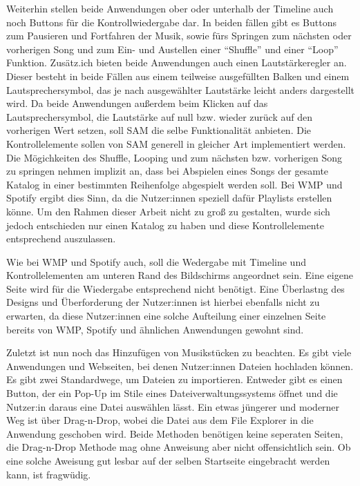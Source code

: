 Weiterhin stellen beide Anwendungen ober oder unterhalb der Timeline auch noch Buttons für die Kontrollwiedergabe dar.
In beiden fällen gibt es Buttons zum Pausieren und Fortfahren der Musik, sowie fürs Springen zum nächsten oder vorherigen Song und zum Ein- und Austellen einer \enquote{Shuffle} und einer \enquote{Loop} Funktion.
Zusätz.ich bieten beide Anwendungen auch einen Lautstärkeregler an.
Dieser besteht in beide Fällen aus einem teilweise ausgefüllten Balken und einem Lautsprechersymbol, das je nach ausgewählter Lautstärke leicht anders dargestellt wird.
Da beide Anwendungen außerdem beim Klicken auf das Lautsprechersymbol, die Lautstärke auf null bzw. wieder zurück auf den vorherigen Wert setzen, soll \ac{SAM} die selbe Funktionalität anbieten.
Die Kontrollelemente sollen von \ac{SAM} generell in gleicher Art implementiert werden.
Die Mögichkeiten des Shuffle, Looping und zum nächsten bzw. vorherigen Song zu springen nehmen implizit an, dass bei Abspielen eines Songs der gesamte Katalog in einer bestimmten Reihenfolge abgespielt werden soll.
Bei \ac{WMP} und Spotify ergibt dies Sinn, da die Nutzer:innen speziell dafür Playlists erstellen könne.
Um den Rahmen dieser Arbeit nicht zu groß zu gestalten, wurde sich jedoch entschieden nur einen Katalog zu haben und diese Kontrollelemente entsprechend auszulassen.

Wie bei \ac{WMP} und Spotify auch, soll die Wedergabe mit Timeline und Kontrollelementen am unteren Rand des Bildschirms angeordnet sein.
Eine eigene Seite wird für die Wiedergabe entsprechend nicht benötigt.
Eine Überlastng des Designs und Überforderung der Nutzer:innen ist hierbei ebenfalls nicht zu erwarten, da diese Nutzer:innen eine solche Aufteilung einer einzelnen Seite bereits von \ac{WMP}, Spotify und ähnlichen Anwendungen gewohnt sind.

Zuletzt ist nun noch das Hinzufügen von Musikstücken zu beachten.
Es gibt viele Anwendungen und Webseiten, bei denen Nutzer:innen Dateien hochladen können.
Es gibt zwei Standardwege, um Dateien zu importieren.
Entweder gibt es einen Button, der ein Pop-Up im Stile eines Dateiverwaltungssystems öffnet und die Nutzer:in daraus eine Datei auswählen lässt.
Ein etwas jüngerer und moderner Weg ist über Drag-n-Drop, wobei die Datei aus dem File Explorer in die Anwendung geschoben wird.
Beide Methoden benötigen keine seperaten Seiten, die Drag-n-Drop Methode mag ohne Anweisung aber nicht offensichtlich sein.
Ob eine solche Aweisung gut lesbar auf der selben Startseite eingebracht werden kann, ist fragwüdig.

